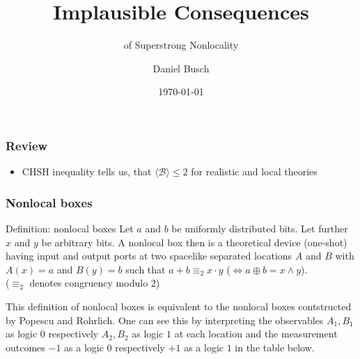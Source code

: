 \documentclass{beamer}
\begin{document}
\title{Implausible Consequences}
\subtitle{of Superstrong Nonlocality}
\author{Daniel Busch}
\date{\today}

\begin{frame}
	\titlepage
\end{frame}

\begin{frame}\frametitle{Review}
  \begin{itemize}
    \item CHSH inequality tells us, that $\langle \mathcal{B} \rangle \leq 2$ for realistic
          and local theories
  \end{itemize}
\end{frame}

\begin{frame}\frametitle{Nonlocal boxes}
  \begin{block}{Definition: nonlocal boxes}
    Let $a$ and $b$ be uniformly distributed bits. Let further $x$ and $y$ be
    arbitrary bits.
    A nonlocal box then is a theoretical device (one-shot) having input and
    output ports at two spacelike separated locations $A$ and $B$ with
    $A(x) = a$ and $B(y) = b$ such that $a + b \equiv_2 x \cdot y$
    ($\Leftrightarrow a \oplus b = x \land y$). \\
    ($\equiv_2$ denotes congruency modulo $2$)
  \end{block}
  
  This definition of nonlocal boxes is equivalent to the nonlocal boxes
  contstructed by Popescu and Rohrlich. One can see this by interpreting
  the observables $A_1, B_1$ as logic $0$ respectively $A_2, B_2$ as logic $1$
  at each location and the measurement outcomes $-1$ as a logic $0$ respectively
  $+1$ as a logic $1$ in the table below.
\end{frame}
  
\end{document}
